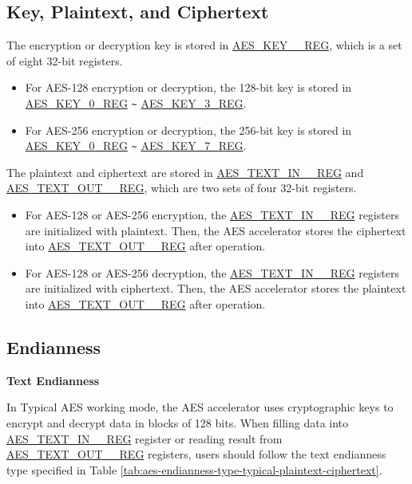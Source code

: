 \documentclass[main\_\_EN.tex]{subfiles}
\begin{document}
\subsection{Key, Plaintext, and Ciphertext}

The encryption or decryption key is stored in \hyperref[regdesc:AESKEYnREG]{AES\_KEY\_\_REG}, which is a set of eight 32-bit registers.

\begin{itemize}
    \item For AES-128 encryption or decryption, the 128-bit key is stored in \hyperref[regdesc:AESKEYnREG]{AES\_KEY\_0\_REG} \verb+~+ \hyperref[regdesc:AESKEYnREG]{AES\_KEY\_3\_REG}.
    \item For AES-256 encryption or decryption, the 256-bit key is stored in \hyperref[regdesc:AESKEYnREG]{AES\_KEY\_0\_REG} \verb+~+ \hyperref[regdesc:AESKEYnREG]{AES\_KEY\_7\_REG}.
\end{itemize}

The plaintext and ciphertext are stored in \hyperref[regdesc:AESTEXTINnREG]{AES\_TEXT\_IN\_\_REG} and \hyperref[regdesc:AESTEXTOUTnREG]{AES\_TEXT\_OUT\_\_REG}, which are two sets of four 32-bit registers.

\begin{itemize}
    \item For AES-128 or AES-256 encryption, the \hyperref[regdesc:AESTEXTINnREG]{AES\_TEXT\_IN\_\_REG} registers are initialized with plaintext. Then, the AES accelerator stores the ciphertext into \hyperref[regdesc:AESTEXTOUTnREG]{AES\_TEXT\_OUT\_\_REG} after operation.
    \item For AES-128 or AES-256 decryption, the \hyperref[regdesc:AESTEXTINnREG]{AES\_TEXT\_IN\_\_REG} registers are initialized with ciphertext. Then, the AES accelerator stores the plaintext into \hyperref[regdesc:AESTEXTOUTnREG]{AES\_TEXT\_OUT\_\_REG} after operation.
\end{itemize}

\clearpage
\subsection{Endianness}

\textbf{Text Endianness}

In Typical AES working mode, the AES accelerator uses cryptographic keys to encrypt and decrypt data in blocks of 128 bits.
When filling data into \hyperref[regdesc:AESTEXTINnREG]{AES\_TEXT\_IN\_\_REG} register or reading result from \hyperref[regdesc:AESTEXTINnREG]{AES\_TEXT\_OUT\_\_REG} registers, users should follow the text endianness type specified in Table \ref{tab:aes-endianness-type-typical-plaintext-ciphertext}.
\end{document}
